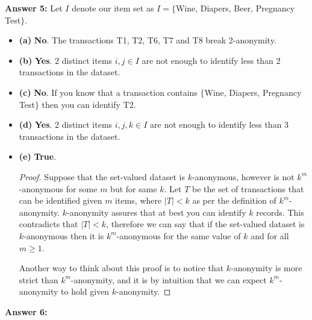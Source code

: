 \documentclass[12pt,reqno]{amsart}
\begin{document}
\newpage
\textbf{Answer 5:} Let $I$ denote our item set as $I = \{$Wine, Diapers, Beer, Pregnancy Test$\}$.
\begin{itemize}[label=]
	\item \textbf{(a)} \textbf{No}. The transactions T1, T2, T6, T7 and T8 break 2-anonymity.
	\item \textbf{(b)} \textbf{Yes}. 2 distinct items $i, j \in I$ are not enough to identify less than 2 transactions in the dataset.
	\item \textbf{(c)} \textbf{No}. If you know that a transaction contains $\{$Wine, Diapers, Pregnancy Test$\}$ then you can identify T2.
	\item \textbf{(d)} \textbf{Yes}. 2 distinct items $i, j, k \in I$ are not enough to identify less than 3 transactions in the dataset.
	\item \textbf{(e)} \textbf{True}. 
	\begin{proof}
	Suppose that the set-valued dataset is $k$-anonymous, however is not $k^m$-anonymous for some $m$ but for same $k$. Let $T$ be the set of transactions that can be identified given $m$ items, where $|T|<k$ as per the definition of $k^m$-anonymity. $k$-anonymity assures that at best you can identify $k$ records. This contradicts that $|T|<k$, therefore we can say that if the set-valued dataset is $k$-anonymous then it is $k^m$-anonymous for the same value of $k$ and for all $m \geq 1$. 
	
	Another way to think about this proof is to notice that $k$-anonymity is more strict than $k^m$-anonymity, and it is by intuition that we can expect $k^m$-anonymity to hold given $k$-anonymity.
	\end{proof}
\end{itemize}
\newpage
\textbf{Answer 6:} 
\end{document}
